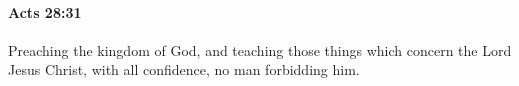 		\paragraph{Acts 28:31} %
			\label{ACTS-28-31}

			Preaching the kingdom of God, and teaching those things which concern the Lord Jesus Christ, with all confidence, no man forbidding him.

			\begin{framed}
			\scriptsize
				\begin{compactdesc}
					\item[SBLG] 
				\end{compactdesc}
			\end{framed}